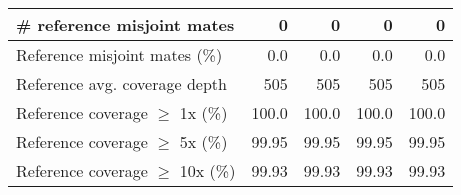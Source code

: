 \documentclass[12pt,a4paper]{article}
\begin{document}
\begin{table}[ht]
\begin{center}
\begin{tabular}{|l*{4}{|r}|}
\# reference misjoint mates & 0 & 0 & 0 & 0 \\ \hline
Reference misjoint mates (\%) & 0.0 & 0.0 & 0.0 & 0.0 \\ \hline
Reference avg. coverage depth & 505 & 505 & 505 & 505 \\ \hline
Reference coverage $\geq$ 1x (\%) & 100.0 & 100.0 & 100.0 & 100.0 \\ \hline
Reference coverage $\geq$ 5x (\%) & 99.95 & 99.95 & 99.95 & 99.95 \\ \hline
Reference coverage $\geq$ 10x (\%) & 99.93 & 99.93 & 99.93 & 99.93 \\ \hline
\end{tabular}
\end{center}
\end{table}
\end{document}
